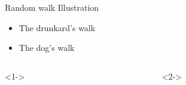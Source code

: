 \documentclass{beamer}
\begin{document}
\begin{frame}
\begin{columns}
\begin{column}{.45\linewidth}
\begin{figure}
\end{figure}
\end{column}
\end{columns}
\end{frame}


\begin{frame}[t,fragile]{Random walk Illustration}
 \begin{itemize}
  \item<1-> The drunkard's walk
  \item<2-> The dog's walk
 \end{itemize}
 
\begin{columns}
\begin{column}{.4\linewidth}<1->
\begin{center}
\end{center}
\end{column}
\begin{column}{.08\linewidth}<2->
        \begin{tikzpicture}[overlay]

\end{tikzpicture}
\end{column}
\end{columns}
\end{frame}
\end{document}
